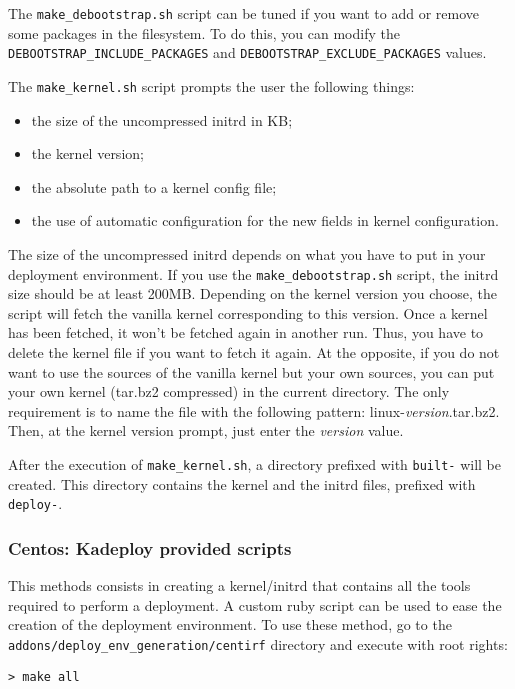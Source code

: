 \documentclass[a4wide,10pt,oneside]{book}
\begin{document}
The \texttt{make\_debootstrap.sh} script can be tuned if you want to add or remove some packages in the filesystem. To do this, you can modify the \texttt{DEBOOTSTRAP\_INCLUDE\_PACKAGES} and \texttt{DEBOOTSTRAP\_EXCLUDE\_PACKAGES} values.

The \texttt{make\_kernel.sh} script prompts the user the following things:
\begin{itemize}
\item the size of the uncompressed initrd in KB;
\item the kernel version;
\item the absolute path to a kernel config file;
\item the use of automatic configuration for the new fields in kernel configuration.
\end{itemize}

The size of the uncompressed initrd depends on what you have to put in your deployment environment. If you use the \texttt{make\_debootstrap.sh} script, the initrd size should be at least 200MB.
Depending on the kernel version you choose, the script will fetch the vanilla kernel corresponding to this version. Once a kernel has been fetched, it won't be fetched again in another run. Thus, you have to delete the kernel file if you want to fetch it again. At the opposite, if you do not want to use the sources of the vanilla kernel but your own sources, you can put your own kernel (tar.bz2 compressed) in the current directory. The only requirement is to name the file with the following pattern: linux-\textit{version}.tar.bz2. Then, at the kernel version prompt, just enter the \textit{version} value.

After the execution of \texttt{make\_kernel.sh}, a directory prefixed with \texttt{built-} will be created. This directory contains the kernel and the initrd files, prefixed with \texttt{deploy-}.

\subsubsection{Centos: Kadeploy provided scripts}
This methods consists in creating a kernel/initrd that contains all the tools required to perform a deployment. A custom ruby script can be used to ease the creation of the deployment environment. To use these method, go to the \texttt{addons/deploy\_env\_generation/centirf} directory and execute with root rights:
\begin{small}
\begin{verbatim}
> make all
\end{verbatim}
\end{small}
\end{document}

